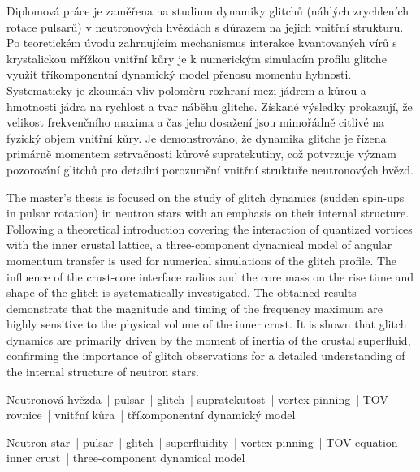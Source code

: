 \documentclass[%
final%
,htext%
]{ipothes}
\begin{document}
\begin{annotation*}
  Diplomová práce je zaměřena na studium dynamiky glitchů (náhlých zrychleních rotace pulsarů) v neutronových hvězdách s důrazem na jejich vnitřní strukturu. Po teoretickém úvodu zahrnujícím mechanismus interakce kvantovaných vírů s krystalickou mřížkou vnitřní kůry je k numerickým simulacím profilu glitche využit tříkomponentní dynamický model přenosu momentu hybnosti. Systematicky je zkoumán vliv poloměru rozhraní mezi jádrem a kůrou a hmotnosti jádra na rychlost a tvar náběhu glitche. Získané výsledky prokazují, že velikost frekvenčního maxima a čas jeho dosažení jsou mimořádně citlivé na fyzický objem vnitřní kůry. Je demonstrováno, že dynamika glitche je řízena primárně momentem setrvačnosti kůrové supratekutiny, což potvrzuje význam pozorování glitchů pro detailní porozumění vnitřní struktuře neutronových hvězd.
\end{annotation*}
\begin{annotation}[english]
  The master's thesis is focused on the study of glitch dynamics (sudden spin-ups in pulsar rotation) in neutron stars with an emphasis on their internal structure. Following a theoretical introduction covering the interaction of quantized vortices with the inner crustal lattice, a three-component dynamical model of angular momentum transfer is used for numerical simulations of the glitch profile. The influence of the crust-core interface radius and the core mass on the rise time and shape of the glitch is systematically investigated. The obtained results demonstrate that the magnitude and timing of the frequency maximum are highly sensitive to the physical volume of the inner crust. It is shown that glitch dynamics are primarily driven by the moment of inertia of the crustal superfluid, confirming the importance of glitch observations for a detailed understanding of the internal structure of neutron stars.
\end{annotation}

\clearpage
\begin{keywords}
  Neutronová hvězda~| pulsar~| glitch~| supratekutost~| vortex pinning~|
  TOV rovnice~| vnitřní kůra~| tříkomponentní dynamický model
\end{keywords}
\begin{keywords}[english]
  Neutron star~| pulsar~| glitch~| superfluidity~| vortex pinning~|
  TOV equation~| inner crust~| three-component dynamical model
\end{keywords}
\end{document}
